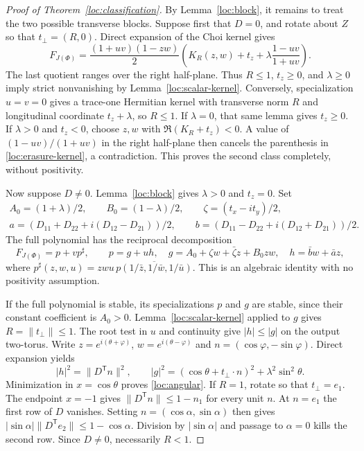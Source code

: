 \documentclass[reqno]{amsart}
\theoremstyle{definition}
\theoremstyle{remark}
\begin{document}
\begin{proof}[Proof of Theorem~\ref{loc:classification}]
By Lemma~\ref{loc:block}, it remains to treat the two possible transverse
blocks.  Suppose first that $D=0$, and rotate about $Z$ so that
$t_\perp=(R,0)$.  Direct expansion of the Choi kernel gives
\begin{equation}\label{loc:erasure-kernel}
 F_{J(\Phi)}=
 \frac{(1+uv)(1-zw)}2
 \left(K_R(z,w)+t_z+\lambda\frac{1-uv}{1+uv}\right).
\end{equation}
The last quotient ranges over the right half-plane.  Thus
$R\leq1$, $t_z\geq0$, and $\lambda\geq0$ imply strict nonvanishing
by Lemma~\ref{loc:scalar-kernel}.
Conversely, specialization $u=v=0$ gives a trace-one Hermitian kernel
with transverse norm $R$ and longitudinal coordinate $t_z+\lambda$,
so $R\leq1$.  If $\lambda=0$, that same lemma gives $t_z\geq0$.
If $\lambda>0$ and $t_z<0$, choose $z,w$ with
$\Re(K_R+t_z)<0$.  A value of $(1-uv)/(1+uv)$ in the right
half-plane then cancels the parenthesis in
\eqref{loc:erasure-kernel}, a contradiction.  This proves the second
class completely, without positivity.

Now suppose $D\ne0$.  Lemma~\ref{loc:block} gives
$\lambda>0$ and $t_z=0$.  Set
\begin{equation}\label{loc:coefficients}
 \begin{gathered}
 A_0=(1+\lambda)/2,\qquad B_0=(1-\lambda)/2,
 \qquad \zeta=(t_x-it_y)/2,\\
 a=(D_{11}+D_{22}+i(D_{12}-D_{21}))/2,\qquad
 b=(D_{11}-D_{22}+i(D_{12}+D_{21}))/2.
 \end{gathered}
\end{equation}
The full polynomial has the reciprocal decomposition
\begin{equation}\label{loc:reciprocal}
 F_{J(\Phi)}=p+vp^\sharp,\qquad
 p=g+uh,\quad
 g=A_0+\zeta w+\bar\zeta z+B_0zw,\quad
 h=\bar b w+\bar a z,
\end{equation}
where
$p^\sharp(z,w,u)=zwu\,\overline{p(1/\bar z,1/\bar w,1/\bar u)}$.
This is an algebraic identity with no positivity assumption.

If the full polynomial is stable, its specializations $p$ and $g$ are
stable, since their constant coefficient is $A_0>0$.
Lemma~\ref{loc:scalar-kernel} applied to $g$ gives
$R=\|t_\perp\|\leq1$.  The root test in $u$ and continuity give
$|h|\leq|g|$ on the output two-torus.  Write
$z=e^{i(\theta+\varphi)}$, $w=e^{i(\theta-\varphi)}$ and
$n=(\cos\varphi,-\sin\varphi)$.  Direct expansion yields
\begin{equation}\label{loc:torus-norms}
 |h|^2=\|D^{\mathsf T}n\|^2,\qquad
 |g|^2=(\cos\theta+t_\perp\cdot n)^2+
                         \lambda^2\sin^2\theta.
\end{equation}
Minimization in $x=\cos\theta$ proves \eqref{loc:angular}.
If $R=1$, rotate so that $t_\perp=e_1$.  The endpoint $x=-1$
gives $\|D^{\mathsf T}n\|\leq1-n_1$ for every unit $n$.
At $n=e_1$ the first row of $D$ vanishes.  Setting
$n=(\cos\alpha,\sin\alpha)$ then gives
$|\sin\alpha|\|D^{\mathsf T}e_2\|\leq1-\cos\alpha$.
Division by $|\sin\alpha|$ and passage to $\alpha=0$ kills the
second row.  Since $D\ne0$, necessarily $R<1$.


\end{proof}
\end{document}
